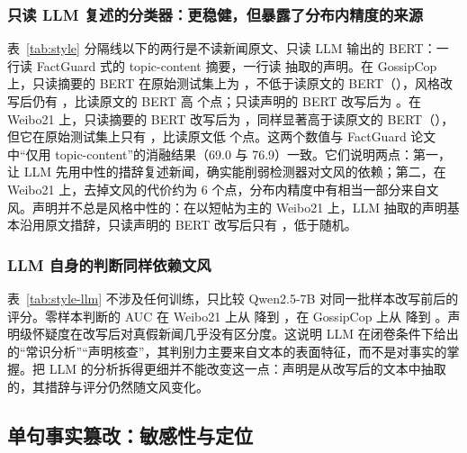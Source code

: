 \subsubsection{只读 LLM 复述的分类器：更稳健，但暴露了分布内精度的来源}
表~\ref{tab:style} 分隔线以下的两行是不读新闻原文、只读 LLM 输出的 BERT：一行读 FactGuard 式的 topic-content 摘要，一行读 \method{} 抽取的声明。在 GossipCop 上，只读摘要的 BERT 在原始测试集上为 ，不低于读原文的 BERT（），风格改写后仍有 ，比读原文的 BERT 高  个点；只读声明的 BERT 改写后为 。在 Weibo21 上，只读摘要的 BERT 改写后为 ，同样显著高于读原文的 BERT（），但它在原始测试集上只有 ，比读原文低  个点。这两个数值与 FactGuard 论文中“仅用 topic-content”的消融结果（69.0 与 76.9）\citep{he2026factguard}一致。它们说明两点：第一，让 LLM 先用中性的措辞复述新闻，确实能削弱检测器对文风的依赖；第二，在 Weibo21 上，去掉文风的代价约为 6 个点，分布内精度中有相当一部分来自文风。声明并不总是风格中性的：在以短帖为主的 Weibo21 上，LLM 抽取的声明基本沿用原文措辞，只读声明的 BERT 改写后只有 ，低于随机。

\subsubsection{LLM 自身的判断同样依赖文风}
表~\ref{tab:style-llm} 不涉及任何训练，只比较 Qwen2.5-7B 对同一批样本改写前后的评分。零样本判断的 AUC 在 Weibo21 上从  降到 ，在 GossipCop 上从  降到 。声明级怀疑度在改写后对真假新闻几乎没有区分度。这说明 LLM 在闭卷条件下给出的“常识分析”“声明核查”，其判别力主要来自文本的表面特征，而不是对事实的掌握。把 LLM 的分析拆得更细并不能改变这一点：声明是从改写后的文本中抽取的，其措辞与评分仍然随文风变化。

\begin{table}[htbp]
\centering\small
\caption{Qwen2.5-7B 的评分在风格改写前后对真假新闻的区分能力}\label{tab:style-llm}
\end{table}

\subsection{单句事实篡改：敏感性与定位}\label{sec:exp-loc}

